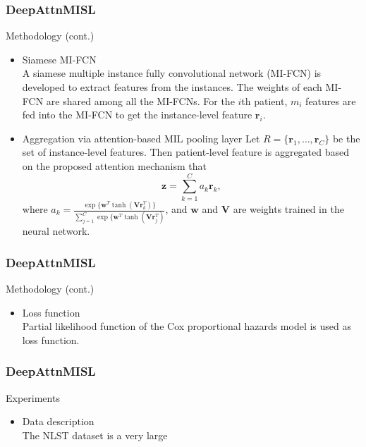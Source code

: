 \documentclass{beamer}
\begin{document}
	\begin{frame}
		\frametitle{DeepAttnMISL}
		Methodology (cont.)
		
		\begin{itemize}
			\item Siamese MI-FCN \\
			A siamese multiple instance fully convolutional network (MI-FCN) is developed to extract features from the instances. The weights of each MI-FCN are shared among all the MI-FCNs. For the $i$th patient, $m_i$ features are fed into the MI-FCN to get the instance-level feature $\mathbf{ r }_i$.
			\item Aggregation via attention-based MIL pooling layer
			Let $R = \{ \mathbf{ r }_1, \dots, \mathbf{ r }_C \}$ be the set of instance-level features. Then patient-level feature is aggregated based on the proposed attention mechanism that 
			\[
			\mathbf{ z } = \sum_{ k = 1 }^{ C } a_k \mathbf{ r }_k,
			\] 
			where $a_k = \frac{ \exp \{ \mathbf{ w }^T \tanh( \mathbf{ V }\mathbf{ r }_k^T ) \}}{ \sum_{ j = 1 }^{ C }\exp \{ \mathbf{ w }^T \tanh( \mathbf{ V }\mathbf{ r }_j^T ) }$, and $\mathbf{ w }$ and $\mathbf{V}$ are weights trained in the neural network.
		\end{itemize}
	\end{frame}
	
	\begin{frame}
		\frametitle{DeepAttnMISL}
		Methodology (cont.)
		
		\begin{itemize}
			\item Loss function \\
			\vspace{5mm}
			Partial likelihood function of the Cox proportional hazards model is used as loss function.
		\end{itemize}
	\end{frame}
	
	\begin{frame}
		\frametitle{DeepAttnMISL}
		Experiments
		
		\begin{itemize}
			\item Data description \\
			\vspace{5mm}
			The NLST dataset is a very large
		\end{itemize}
	\end{frame}
	
	\begin{frame}[allowframebreaks]
		\begin{singlespace}
			
			
		\end{singlespace}
	\end{frame}
	
\end{document}
